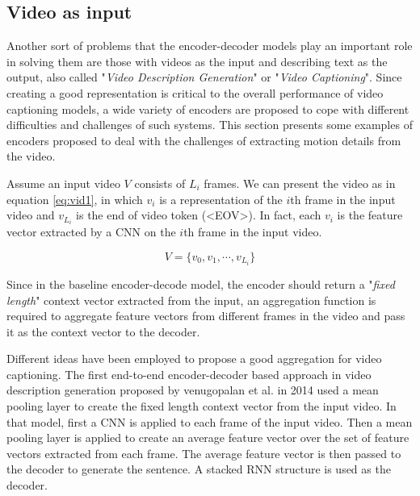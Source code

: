 \documentclass[preprint, 10pt]{elsarticle}
\begin{document}
		\subsection{Video as input}
		Another sort of problems that the encoder-decoder models play an important role in solving them are those with videos as the input and describing text as the output, also called "\textit{Video Description Generation}" or "\textit{Video Captioning}". Since creating a good representation is critical to the overall performance of video captioning models, a wide variety of encoders are proposed to cope with different difficulties and challenges of such systems. This section presents some examples of encoders proposed to deal with the challenges of extracting motion details from the video.
		
		Assume an input video $V$ consists of $L_i$ frames. We can present the video as in equation \eqref{eq:vid1}, in which $v_i$ is a representation of the $i$th frame in the input video and $v_{L_i}$ is the end of video token (<EOV>). In fact, each $v_i$ is the feature vector extracted by a CNN on the $i$th frame in the input video.
		
		\begin{equation}
			V = \{v_0, v_1, \cdots, v_{L_i}\}
			\label{eq:vid1}
		\end{equation}
		
		Since in the baseline encoder-decode model, the encoder should return a "\textit{fixed length}" context vector extracted from the input, an aggregation function is required to aggregate feature vectors from different frames in the video and pass it as the context vector to the decoder. 
		
		Different ideas have been employed to propose a good aggregation for video captioning. The first end-to-end encoder-decoder based approach in video description generation proposed by venugopalan et al. in 2014 \cite{venugopalan2014translating} used a mean pooling layer to create the fixed length context vector from the input video. In that model, first a CNN is applied to each frame of the input video. Then a mean pooling layer is applied to create an average feature vector over the set of feature vectors extracted from each frame. The average feature vector is then passed to the decoder to generate the sentence. A stacked RNN structure is used as the decoder.
		
\end{document}
